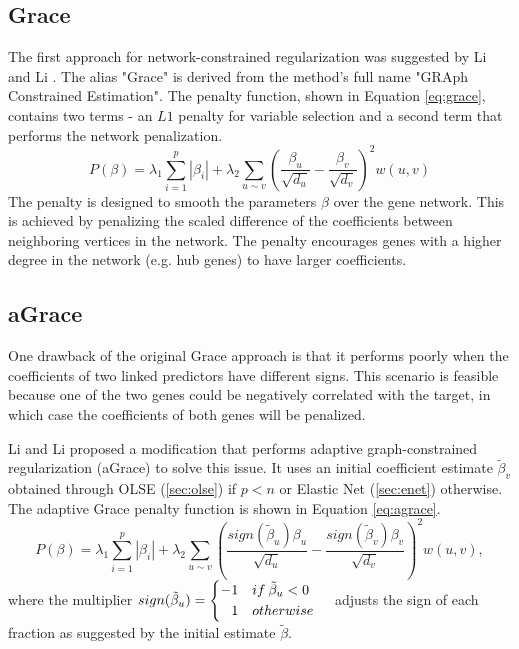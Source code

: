 \subsection{Grace}
The first approach for network-constrained regularization was suggested by Li and Li \cite{li2008network}. The alias "Grace" is derived from the method's full name "GRAph Constrained Estimation". The penalty function, shown in Equation \ref{eq:grace}, contains two terms - an $L1$ penalty for variable selection and a second term that performs the network penalization.  
\begin{equation} \label{eq:grace}
P(\beta) = \lambda_1\sum_{i=1}^{p}\left|\beta_i\right| + \lambda_2\sum_{u \sim v}\left(\frac{\beta_u}{\sqrt{d_u}}-\frac{\beta_v}{\sqrt{d_v}}\right)^2w(u,v)
\end{equation}
The penalty is designed to smooth the parameters $\beta$ over the gene network. This is achieved by penalizing the scaled difference of the coefficients between neighboring vertices in the network. The penalty encourages genes with a higher degree in the network (e.g. hub genes) to have larger coefficients.


\subsection{aGrace} \label{sec:agrace}
One drawback of the original Grace approach is that it performs poorly when the coefficients of two linked predictors have different signs. This scenario is feasible because one of the two genes could be negatively correlated with the target, in which case the coefficients of both genes will be penalized.  

Li and Li proposed a modification \cite{li2010variable} that performs adaptive graph-constrained regularization (aGrace) to solve this issue. It uses an initial coefficient estimate $\tilde{\beta}_v$ obtained through OLSE (\ref{sec:olse}) if $p<n$ or Elastic Net (\ref{sec:enet}) otherwise. The adaptive Grace penalty function is shown in Equation \ref{eq:agrace}.
\begin{equation} \label{eq:agrace}
P(\beta) = \lambda_1\sum_{i=1}^{p}\left|\beta_i\right| + \lambda_2\sum_{u \sim v}\left(\frac{sign(\tilde{\beta}_u)\beta_u}{\sqrt{d_u}}-\frac{sign(\tilde{\beta}_v)\beta_v}{\sqrt{d_v}}\right)^2w(u,v),
\end{equation}
where the multiplier $sign(\tilde{\beta}_u) = \left\{ \begin{aligned} -1 &\quad if \: \tilde{\beta}_u < 0 \cr 1 &\quad otherwise \end{aligned} \right.$ adjusts the sign of each fraction as suggested by the initial estimate $\tilde{\beta}$.



